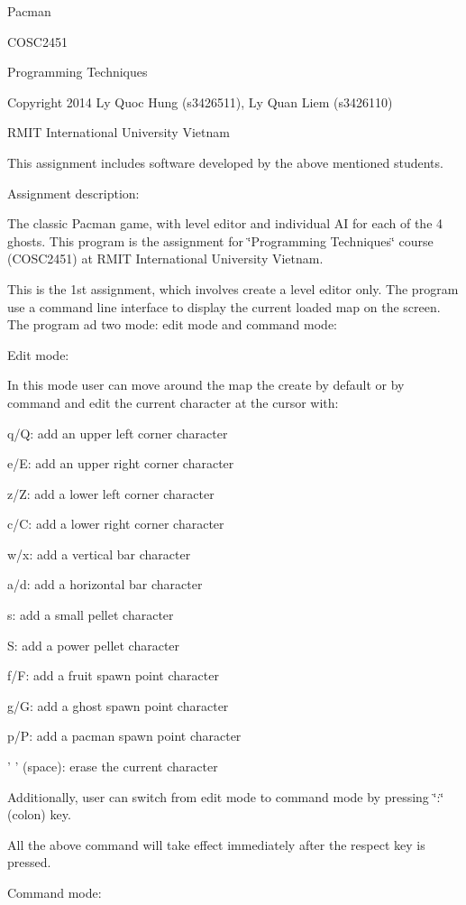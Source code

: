 Pacman

C\-O\-S\-C2451

Programming Techniques

Copyright 2014 Ly Quoc Hung (s3426511), Ly Quan Liem (s3426110)

R\-M\-I\-T International University Vietnam

This assignment includes software developed by the above mentioned students.

Assignment description\-:

The classic Pacman game, with level editor and individual A\-I for each of the 4 ghosts. This program is the assignment for \char`\"{}\-Programming Techniques\char`\"{} course (C\-O\-S\-C2451) at R\-M\-I\-T International University Vietnam.

This is the 1st assignment, which involves create a level editor only. The program use a command line interface to display the current loaded map on the screen. The program ad two mode\-: edit mode and command mode\-:

Edit mode\-:

In this mode user can move around the map the create by default or by command and edit the current character at the cursor with\-:

q/\-Q\-: add an upper left corner character

e/\-E\-: add an upper right corner character

z/\-Z\-: add a lower left corner character

c/\-C\-: add a lower right corner character

w/x\-: add a vertical bar character

a/d\-: add a horizontal bar character

s\-: add a small pellet character

S\-: add a power pellet character

f/\-F\-: add a fruit spawn point character

g/\-G\-: add a ghost spawn point character

p/\-P\-: add a pacman spawn point character

' ' (space)\-: erase the current character

Additionally, user can switch from edit mode to command mode by pressing \char`\"{}\-:\char`\"{} (colon) key.

All the above command will take effect immediately after the respect key is pressed.

Command mode\-:

